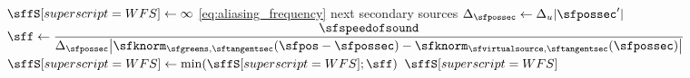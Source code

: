 \begin{algorithmic}[1]
    \State $\sffS[superscript=WFS] \gets \infty$
        \Comment \eqref{eq:aliasing_frequency}
        \State \Continue 
        \Comment next secondary sources
      \EndIf
      \State $\Delta_{\sfpossec} \gets \Delta_u |\sfpossec'|$
      \State
      $\displaystyle
      \sff \gets
        \frac{\sfspeedofsound}
        {%
        \Delta_{\sfpossec}
        \big|
        \sfknorm_{\sfgreens,\sftangentsec}(\sfpos-\sfpossec) -
        \sfknorm_{\sfvirtualsource,\sftangentsec}(\sfpossec)
        \big|
        }
      $
      \Comment{\eqref{eq:aliasing_frequency_pair}}
      \State $\sffS[superscript=WFS] \gets \min(\sffS[superscript=WFS]; \sff)$
      \Comment{\eqref{eq:aliasing_frequency}}
    \EndFor
    \State \Return $\sffS[superscript=WFS]$
  \EndFunction
\end{algorithmic}